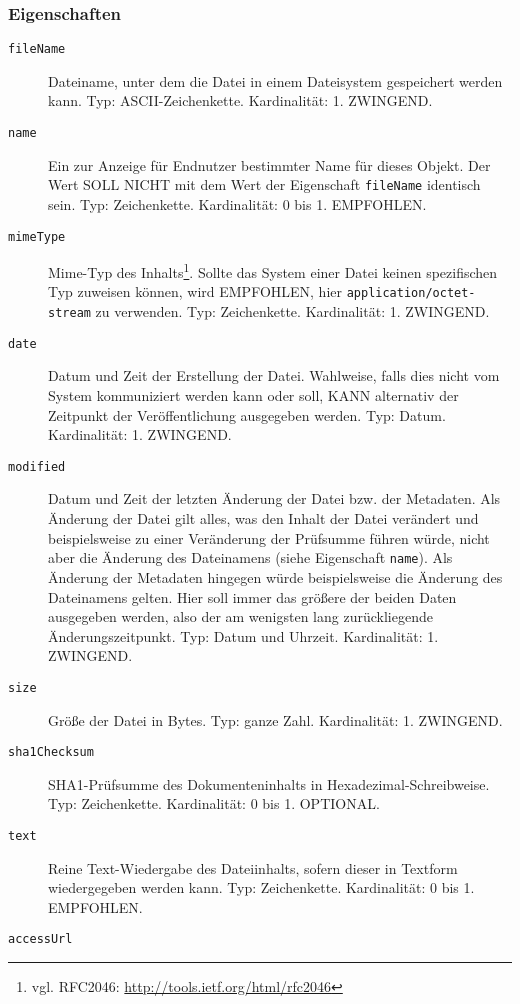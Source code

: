 \documentclass[,a4paper]{article}
\begin{document}
\subsubsection{Eigenschaften}\label{eigenschaften-7}

\begin{description}
\item[\texttt{fileName}]
Dateiname, unter dem die Datei in einem Dateisystem gespeichert werden
kann. Typ: ASCII-Zeichenkette. Kardinalität: 1. ZWINGEND.
\item[\texttt{name}]
Ein zur Anzeige für Endnutzer bestimmter Name für dieses Objekt. Der
Wert SOLL NICHT mit dem Wert der Eigenschaft \texttt{fileName} identisch
sein. Typ: Zeichenkette. Kardinalität: 0 bis 1. EMPFOHLEN.
\item[\texttt{mimeType}]
Mime-Typ des Inhalts\footnote{vgl. RFC2046:
  \url{http://tools.ietf.org/html/rfc2046}}. Sollte das System einer
Datei keinen spezifischen Typ zuweisen können, wird EMPFOHLEN, hier
\texttt{application/octet-stream} zu verwenden. Typ: Zeichenkette.
Kardinalität: 1. ZWINGEND.
\item[\texttt{date}]
Datum und Zeit der Erstellung der Datei. Wahlweise, falls dies nicht vom
System kommuniziert werden kann oder soll, KANN alternativ der Zeitpunkt
der Veröffentlichung ausgegeben werden. Typ: Datum. Kardinalität: 1.
ZWINGEND.
\item[\texttt{modified}]
Datum und Zeit der letzten Änderung der Datei bzw. der Metadaten. Als
Änderung der Datei gilt alles, was den Inhalt der Datei verändert und
beispielsweise zu einer Veränderung der Prüfsumme führen würde, nicht
aber die Änderung des Dateinamens (siehe Eigenschaft \texttt{name}). Als
Änderung der Metadaten hingegen würde beispielsweise die Änderung des
Dateinamens gelten. Hier soll immer das größere der beiden Daten
ausgegeben werden, also der am wenigsten lang zurückliegende
Änderungszeitpunkt. Typ: Datum und Uhrzeit. Kardinalität: 1. ZWINGEND.
\item[\texttt{size}]
Größe der Datei in Bytes. Typ: ganze Zahl. Kardinalität: 1. ZWINGEND.
\item[\texttt{sha1Checksum}]
SHA1-Prüfsumme des Dokumenteninhalts in Hexadezimal-Schreibweise. Typ:
Zeichenkette. Kardinalität: 0 bis 1. OPTIONAL.
\item[\texttt{text}]
Reine Text-Wiedergabe des Dateiinhalts, sofern dieser in Textform
wiedergegeben werden kann. Typ: Zeichenkette. Kardinalität: 0 bis 1.
EMPFOHLEN.
\item[\texttt{accessUrl}]

\end{description}
\end{document}
